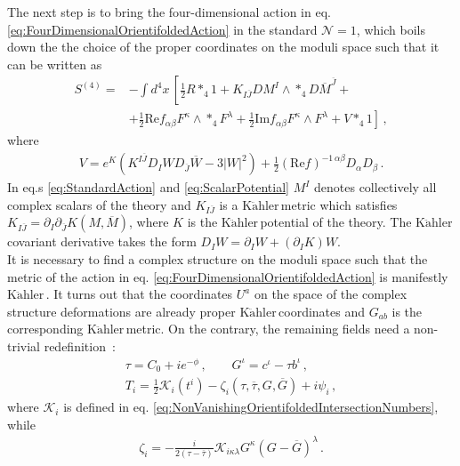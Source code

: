\documentclass[12pt,a4paper]{book}
\newcommand{\Kahler}{\ensuremath{\text{K}\ddot{\text{a}}\text{hler}\,}}
\begin{document}
The next step is to bring the four-dimensional action in eq. \eqref{eq:FourDimensionalOrientifoldedAction} in the standard $\mathcal{N} = 1$, which boils down the the choice of the proper coordinates on the moduli space such that it can be written as
\begin{align}
\label{eq:StandardAction}
S^{(4)} =& - \int d^4x \, \left[\frac{1}{2} R *_4 1 + K_{I \overline{J}} DM^I \wedge *_4 D\overline{M}^{\overline{J}} +\right. \nonumber \\
&\left. + \frac{1}{2} \text{Re} f_{\alpha \beta} F^{\kappa} \wedge *_4 F^{\lambda} + \frac{1}{2} \text{Im} f_{\alpha \beta} F^{\kappa} \wedge F^{\lambda} + V *_4 1 \right] \,,
\end{align}
where
\begin{align}
\label{eq:ScalarPotential}
V = e^K \left(K^{I \overline{J}} D_I W D_{\overline{J}} \overline{W} - 3 |W|^2\right) + \frac{1}{2} \left(\text{Re} f\right)^{-1 \, \alpha \beta} D_\alpha D_{\beta} \,.
\end{align}
In eq.s \eqref{eq:StandardAction} and \eqref{eq:ScalarPotential} $M^I$ denotes collectively all complex scalars of the theory and $K_{I \overline{J}}$ is a \Kahler metric which satisfies $K_{I \overline{J}} = \partial_I \partial_{\overline{J}} K(M, \overline{M})$, where $K$ is the \Kahler potential of the theory. The \Kahler covariant derivative takes the form $D_I W = \partial_I W + (\partial_I K) W$.\\

It is necessary to find a complex structure on the moduli space such that the metric of the action in eq. \eqref{eq:FourDimensionalOrientifoldedAction} is manifestly \Kahler. It turns out that the coordinates $U^a$ on the space of the complex structure deformations are already proper \Kahler coordinates and $G_{ab}$ is the corresponding \Kahler metric. On the contrary, the remaining fields need a non-trivial redefinition~\cite{Grana:2003ek, Becker:2002nn}:
\begin{align}
\label{eq:FieldRedefinition}
\tau = C_0 + i e^{-\phi} \,, \qquad G^\iota = c^\iota - \tau b^\iota \,, \nonumber \\
T_i = \frac{1}{2} \mathcal{K}_i(t^i) - \zeta_i(\tau, \overline{\tau}, G, \overline{G}) + i \psi_i\,,
\end{align}
where $\mathcal{K}_i$ is defined in eq. \eqref{eq:NonVanishingOrientifoldedIntersectionNumbers}, while
\begin{align}
\label{eq:Zeta}
\zeta_i = - \frac{i}{2 (\tau - \overline{\tau})} \mathcal{K}_{i \kappa \lambda} G^\kappa (G - \overline{G})^{\lambda}\,.
\end{align}
\end{document}
